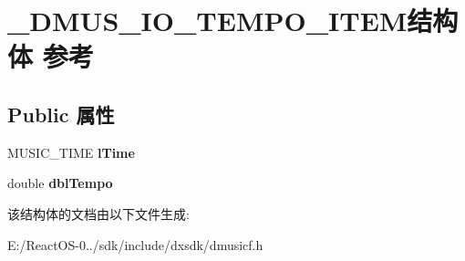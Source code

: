 \hypertarget{struct___d_m_u_s___i_o___t_e_m_p_o___i_t_e_m}{}\section{\+\_\+\+D\+M\+U\+S\+\_\+\+I\+O\+\_\+\+T\+E\+M\+P\+O\+\_\+\+I\+T\+E\+M结构体 参考}
\label{struct___d_m_u_s___i_o___t_e_m_p_o___i_t_e_m}
\subsection*{Public 属性}
\begin{DoxyCompactItemize}
\item 
\mbox{\label{struct___d_m_u_s___i_o___t_e_m_p_o___i_t_e_m_a821ef98cd03f0960ca0c61c8eff276d2}} 
M\+U\+S\+I\+C\+\_\+\+T\+I\+ME {\bfseries l\+Time}
\item 
\mbox{\label{struct___d_m_u_s___i_o___t_e_m_p_o___i_t_e_m_a6b83dcf71bed6910680af2822c2021ac}} 
double {\bfseries dbl\+Tempo}
\end{DoxyCompactItemize}


该结构体的文档由以下文件生成\+:\begin{DoxyCompactItemize}
\item 
E\+:/\+React\+O\+S-\/0../sdk/include/dxsdk/dmusicf.\+h\end{DoxyCompactItemize}
